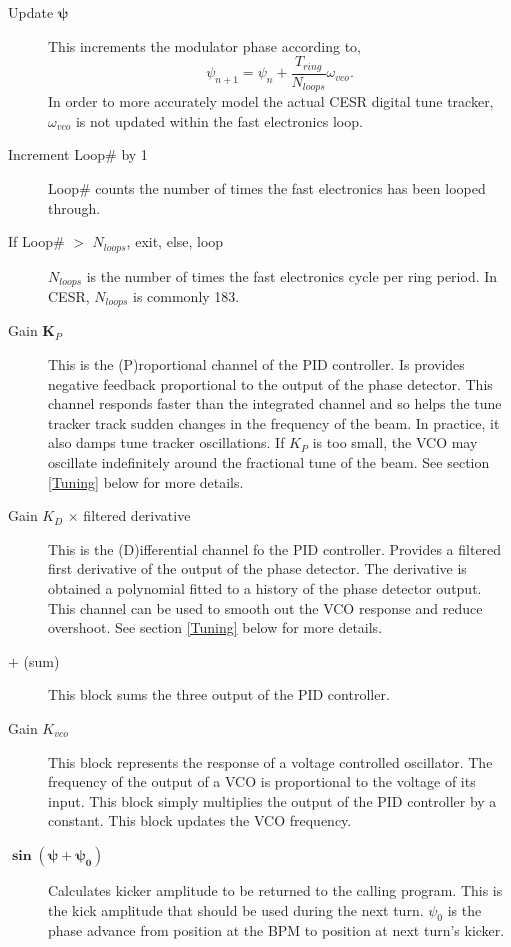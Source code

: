 \begin{description}
\item[Update $\boldsymbol{\psi}$] This increments the modulator phase according to,
\begin{equation}
\psi_{n+1}=\psi_n+\frac{T_{ring}}{N_{loops}}\omega_{vco}\textrm{.}
\end{equation}
In order to more accurately model the actual CESR digital tune tracker, 
$\omega_{vco}$ is not updated within the fast electronics loop.

\item[Increment Loop\# by 1]  
Loop\# counts the number of times the fast electronics has been looped
through.

\item[If Loop\# $>$ $N_{loops}$, exit, else, loop]  
$N_{loops}$ is the number of times the fast electronics cycle per ring
period.  In CESR, $N_{loops}$ is commonly 183.

\item[Gain $\boldsymbol K_P$] 
This is the (P)roportional channel of the PID controller.  Is provides
negative feedback proportional to the output of the phase detector.
This channel responds faster than the integrated channel and so helps
the tune tracker track sudden changes in the frequency of the beam.
In practice, it also damps tune tracker oscillations.  If $K_P$ is too
small, the VCO may oscillate indefinitely around the fractional tune
of the beam.  See section \ref{Tuning} below for more details.

\item[Gain $K_D$ $\times$ filtered derivative]  
This is the (D)ifferential channel fo the PID controller.  Provides a
filtered first derivative of the output of the phase detector.  The
derivative is obtained a polynomial fitted to a history of the phase
detector output.  This channel can be used to smooth out the VCO
response and reduce overshoot.  See section \ref{Tuning} below for
more details.

\item[$\boldsymbol +$ (sum)]  
This block sums the three output of the PID controller.

\item[Gain $K_{vco}$] 
This block represents the response of a voltage controlled oscillator.
The frequency of the output of a VCO is proportional to the voltage of
its input.  This block simply multiplies the output of the PID
controller by a constant.  This block updates the VCO frequency.

\item[$\boldsymbol{\sin\left(\psi+\psi_0\right)}$]  
Calculates kicker amplitude to be returned to the calling program.
This is the kick amplitude that should be used during the next turn.
$\psi_0$ is the phase advance from position at the BPM to position at
next turn's kicker.

\end{description}

